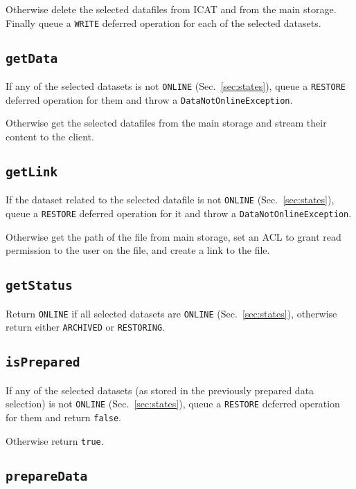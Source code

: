 \documentclass[paper=a4]{scrartcl}
\begin{document}
Otherwise delete the selected datafiles from ICAT and from the main
storage.  Finally queue a \texttt{WRITE} deferred operation for each
of the selected datasets.

\subsection{\texttt{getData}}
\label{sec:requests:getdata}

If any of the selected datasets is not \texttt{ONLINE}
(Sec.\ \ref{sec:states}), queue a \texttt{RESTORE} deferred operation
for them and throw a \texttt{DataNotOnlineException}.

Otherwise get the selected datafiles from the main storage and stream
their content to the client.

\subsection{\texttt{getLink}}
\label{sec:requests:getlink}

If the dataset related to the selected datafile is not \texttt{ONLINE}
(Sec.\ \ref{sec:states}), queue a \texttt{RESTORE} deferred operation
for it and throw a \texttt{DataNotOnlineException}.

Otherwise get the path of the file from main storage, set an ACL to
grant read permission to the user on the file, and create a link to
the file.

\subsection{\texttt{getStatus}}

Return \texttt{ONLINE} if all selected datasets are \texttt{ONLINE}
(Sec.\ \ref{sec:states}), otherwise return either \texttt{ARCHIVED} or
\texttt{RESTORING}.

\subsection{\texttt{isPrepared}}

If any of the selected datasets (as stored in the previously prepared
data selection) is not \texttt{ONLINE} (Sec.\ \ref{sec:states}), queue
a \texttt{RESTORE} deferred operation for them and return
\texttt{false}.

Otherwise return \texttt{true}.

\subsection{\texttt{prepareData}}
\end{document}
